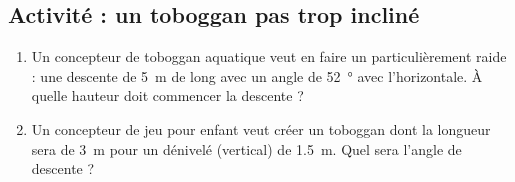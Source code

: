 
\subsection*{Activité : un toboggan pas trop incliné}

\begin{enumerate}
    \item
        Un concepteur de toboggan aquatique veut en faire un particulièrement raide : une descente de \SI{5}{\meter} de long avec un angle de \SI{52}{\degree} avec l'horizontale. À quelle hauteur doit commencer la descente ?
    \item
        Un concepteur de jeu pour enfant veut créer un toboggan dont la longueur sera de \SI{3}{\meter} pour un dénivelé (vertical) de \SI{1.5}{\meter}. Quel sera l'angle de descente ?
\end{enumerate}
